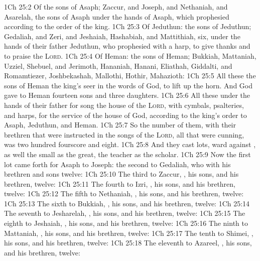 \vs 1Ch 25:2 Of the sons of Asaph; Zaccur, and Joseph, and Nethaniah, and Asarelah, the sons of Asaph under the hands of Asaph, which prophesied according to the order of the king.
\vs 1Ch 25:3 Of Jeduthun: the sons of Jeduthun; Gedaliah, and Zeri, and Jeshaiah, Hashabiah, and Mattithiah, six, under the hands of their father Jeduthun, who prophesied with a harp, to give thanks and to praise the \textsc{Lord}.
\vs 1Ch 25:4 Of Heman: the sons of Heman; Bukkiah, Mattaniah, Uzziel, Shebuel, and Jerimoth, Hananiah, Hanani, Eliathah, Giddalti, and Romamtiezer, Joshbekashah, Mallothi, Hothir,  Mahazioth:
\vs 1Ch 25:5 All these  the sons of Heman the king's seer in the words of God, to lift up the horn. And God gave to Heman fourteen sons and three daughters.
\vs 1Ch 25:6 All these  under the hands of their father for song  the house of the \textsc{Lord}, with cymbals, psalteries, and harps, for the service of the house of God, according to the king's order to Asaph, Jeduthun, and Heman.
\vs 1Ch 25:7 So the number of them, with their brethren that were instructed in the songs of the \textsc{Lord},  all that were cunning, was two hundred fourscore and eight.
\vs 1Ch 25:8 And they cast lots, ward against , as well the small as the great, the teacher as the scholar.
\vs 1Ch 25:9 Now the first lot came forth for Asaph to Joseph: the second to Gedaliah, who with his brethren and sons  twelve:
\vs 1Ch 25:10 The third to Zaccur, , his sons, and his brethren,  twelve:
\vs 1Ch 25:11 The fourth to Izri, , his sons, and his brethren,  twelve:
\vs 1Ch 25:12 The fifth to Nethaniah, , his sons, and his brethren,  twelve:
\vs 1Ch 25:13 The sixth to Bukkiah, , his sons, and his brethren,  twelve:
\vs 1Ch 25:14 The seventh to Jesharelah, , his sons, and his brethren,  twelve:
\vs 1Ch 25:15 The eighth to Jeshaiah, , his sons, and his brethren,  twelve:
\vs 1Ch 25:16 The ninth to Mattaniah, , his sons, and his brethren,  twelve:
\vs 1Ch 25:17 The tenth to Shimei, , his sons, and his brethren,  twelve:
\vs 1Ch 25:18 The eleventh to Azareel, , his sons, and his brethren,  twelve:
